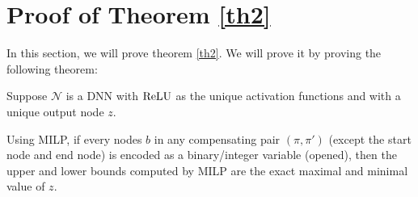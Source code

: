 				
				
				\section{Proof of Theorem \ref{th2}}
				
				In this section, we will prove theorem \ref{th2}. We will prove it by proving the following theorem:
				
				\begin{theorem} \label{thm:2}
				
					
					Suppose $\mathcal{N}$ is a DNN with $\mathrm{ReLU}$ as the unique activation functions and with a unique output node $z$.
					
					Using MILP, if every nodes $b$ in any compensating pair
					$(\pi,\pi')$ (except the start node and end node) is encoded as a binary/integer variable (opened), then the upper and lower 
					bounds computed by MILP are the exact maximal and minimal value of $z$.
				\end{theorem}
				
